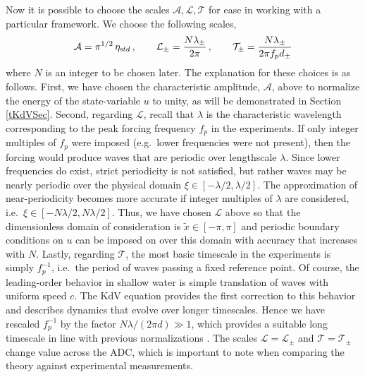 \documentclass[11pt]{article}
\newcommand{\freqp}{f_p}
\newcommand{\etastd}{\eta_{\text std}}
\newcommand{\depth}{d}
\newcommand{\dupdn}{\depth_{\pm}}
\newcommand{\lam}{\lambda}
\newcommand{\lamupdn}{\lam_{\pm}}
\newcommand{\lamfac}{N}
\newcommand{\ampscale}{\mathcal{A}}
\newcommand{\lengthscale}{\mathcal{L}}
\newcommand{\timescale}{\mathcal{T}}
\begin{document}
Now it is possible to choose the scales $\ampscale, \lengthscale, \timescale$ for ease in working with a particular framework. We choose the following scales,
\begin{align}
\label{scales}
\ampscale = \pi^{1/2} \, \etastd \, , \qquad
\lengthscale_{\pm} = \frac{\lamfac \lamupdn}{2 \pi} \, , \qquad
\timescale_{\pm} = \frac{\lamfac \lamupdn}{2 \pi \freqp \dupdn}
\end{align}
where $\lamfac$ is an integer to be chosen later. 
The explanation for these choices is as follows. First, we have chosen the characteristic amplitude, $\ampscale$, above to normalize the energy of the state-variable $u$ to unity, as will be demonstrated in Section \ref{tKdVSec}. Second, regarding $\lengthscale$, recall that $\lam$ is the characteristic wavelength corresponding to the peak forcing frequency $\freqp$ in the experiments. If only integer multiples of $\freqp$ were imposed (e.g.~lower frequencies were not present), then the forcing would produce waves that are periodic over lengthscale $\lam$. Since lower frequencies do exist, strict periodicity is not satisfied, but rather waves may be nearly periodic over the physical domain $\xi \in [-\lam/2, \lam/2]$. The approximation of near-periodicity becomes more accurate if integer multiples of $\lam$ are considered, i.e.~$\xi \in [-\lamfac \lam/2, \lamfac \lam/2]$. Thus, we have chosen $\lengthscale$ above so that the dimensionless domain of consideration is $\tilde{x} \in [-\pi, \pi]$ and periodic boundary conditions on $u$ can be  imposed on over this domain with accuracy that increases with $\lamfac$. Lastly, regarding $\timescale$, the most basic timescale in the experiments is simply $\freqp^{-1}$, i.e.~the period of waves passing a fixed reference point. Of course, the leading-order behavior in shallow water is simple translation of waves with uniform speed $c$. The KdV equation provides the first correction to this behavior and describes dynamics that evolve over longer timescales. Hence we have rescaled $\freqp^{-1}$ by the factor $N \lam/(2 \pi \depth) \gg 1$, which provides a suitable long timescale in line with previous normalizations \cite{johnson1997modern}. The scales $\lengthscale = \lengthscale_{\pm}$ and $\timescale = \timescale_{\pm}$ change value across the ADC, which is important to note when comparing the theory against experimental measurements.
\end{document}
